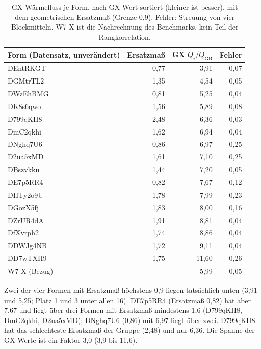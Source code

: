 \begin{table}[H]\centering\small
\begin{tabular}{lrrr}\toprule
Form (Datensatz, unverändert) & Ersatzmaß & GX $Q_i/Q_{\mathrm{GB}}$ & Fehler\\\midrule
DEntRKGT & 0,77 & 3,91 & 0,07\\
DGMtrTL2 & 1,35 & 4,54 & 0,05\\
DWzEhBMG & 0,81 & 5,25 & 0,04\\
DK8s6qwo & 1,56 & 5,89 & 0,08\\
D799qKH8 & 2,48 & 6,36 & 0,03\\
DmC2qkhi & 1,62 & 6,94 & 0,04\\
DNghq7U6 & 0,86 & 6,97 & 0,25\\
D2ua5xMD & 1,61 & 7,10 & 0,25\\
DBszvkku & 1,44 & 7,20 & 0,05\\
DE7p5RR4 & 0,82 & 7,67 & 0,12\\
DHTy2o9U & 1,78 & 7,99 & 0,23\\
DGozX5fj & 1,83 & 8,00 & 0,16\\
DZrUR4dA & 1,91 & 8,81 & 0,04\\
DfXvrph2 & 1,74 & 8,86 & 0,04\\
DDWJg4NB & 1,72 & 9,11 & 0,04\\
DD7wTXH9 & 1,75 & 11,60 & 0,26\\\midrule
W7-X (Bezug) & -- & 5,99 & 0,05\\\bottomrule
\end{tabular}
\caption{GX-Wärmefluss je Form, nach GX-Wert sortiert (kleiner ist besser), mit dem geometrischen Ersatzmaß (Grenze 0,9). Fehler: Streuung von vier Blockmitteln. W7-X ist die Nachrechnung des Benchmarks, kein Teil der Rangkorrelation.}
\end{table}

Zwei der vier Formen mit Ersatzmaß höchstens 0,9 liegen tatsächlich unten (3,91 und 5,25; Platz 1 und 3 unter allen 16). DE7p5RR4 (Ersatzmaß 0,82) hat aber 7,67 und liegt über drei Formen mit Ersatzmaß mindestens 1,6 (D799qKH8, DmC2qkhi, D2ua5xMD); DNghq7U6 (0,86) mit 6,97 liegt über zwei. D799qKH8 hat das schlechteste Ersatzmaß der Gruppe (2,48) und nur 6,36.
Die Spanne der GX-Werte ist ein Faktor 3,0 (3,9 bis 11,6). 

